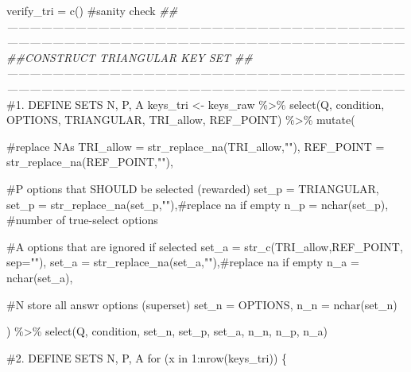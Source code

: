 \documentclass[
  letterpaper,
  DIV=11,
  numbers=noendperiod]{scrreprt}
\newenvironment{Shaded}{\begin{snugshade}}{\end{snugshade}}
\newcommand{\AttributeTok}[1]{\textcolor[rgb]{0.40,0.45,0.13}{#1}}
\newcommand{\CommentTok}[1]{\textcolor[rgb]{0.37,0.37,0.37}{#1}}
\newcommand{\ControlFlowTok}[1]{\textcolor[rgb]{0.00,0.23,0.31}{#1}}
\newcommand{\DecValTok}[1]{\textcolor[rgb]{0.68,0.00,0.00}{#1}}
\newcommand{\DocumentationTok}[1]{\textcolor[rgb]{0.37,0.37,0.37}{\textit{#1}}}
\newcommand{\FunctionTok}[1]{\textcolor[rgb]{0.28,0.35,0.67}{#1}}
\newcommand{\NormalTok}[1]{\textcolor[rgb]{0.00,0.23,0.31}{#1}}
\newcommand{\OtherTok}[1]{\textcolor[rgb]{0.00,0.23,0.31}{#1}}
\newcommand{\SpecialCharTok}[1]{\textcolor[rgb]{0.37,0.37,0.37}{#1}}
\newcommand{\StringTok}[1]{\textcolor[rgb]{0.13,0.47,0.30}{#1}}
\begin{document}
\begin{Shaded}
\begin{Highlighting}[]
\NormalTok{verify\_tri }\OtherTok{=} \FunctionTok{c}\NormalTok{() }\CommentTok{\#sanity check}
\DocumentationTok{\#\#——————————————————————————————————————————————————————————————————————}
\DocumentationTok{\#\#CONSTRUCT TRIANGULAR KEY SET}
\DocumentationTok{\#\#——————————————————————————————————————————————————————————————————————}
\CommentTok{\#1. DEFINE SETS N, P, A}
\NormalTok{keys\_tri }\OtherTok{\textless{}{-}}\NormalTok{ keys\_raw }\SpecialCharTok{\%\textgreater{}\%} 
  \FunctionTok{select}\NormalTok{(Q, condition, OPTIONS, TRIANGULAR, TRI\_allow, REF\_POINT) }\SpecialCharTok{\%\textgreater{}\%} 
  \FunctionTok{mutate}\NormalTok{(}
    
    \CommentTok{\#replace NAs }
    \AttributeTok{TRI\_allow =} \FunctionTok{str\_replace\_na}\NormalTok{(TRI\_allow,}\StringTok{""}\NormalTok{),}
    \AttributeTok{REF\_POINT =} \FunctionTok{str\_replace\_na}\NormalTok{(REF\_POINT,}\StringTok{""}\NormalTok{),}
    
    \CommentTok{\#P options that SHOULD be selected (rewarded)}
    \AttributeTok{set\_p =}\NormalTok{ TRIANGULAR,}
    \AttributeTok{set\_p =} \FunctionTok{str\_replace\_na}\NormalTok{(set\_p,}\StringTok{""}\NormalTok{),}\CommentTok{\#replace na if empty}
    \AttributeTok{n\_p =} \FunctionTok{nchar}\NormalTok{(set\_p), }\CommentTok{\#number of true{-}select options}
    
    \CommentTok{\#A options that are ignored if selected }
    \AttributeTok{set\_a =} \FunctionTok{str\_c}\NormalTok{(TRI\_allow,REF\_POINT, }\AttributeTok{sep=}\StringTok{""}\NormalTok{),}
    \AttributeTok{set\_a =} \FunctionTok{str\_replace\_na}\NormalTok{(set\_a,}\StringTok{""}\NormalTok{),}\CommentTok{\#replace na if empty}
    \AttributeTok{n\_a =} \FunctionTok{nchar}\NormalTok{(set\_a),}
    
    \CommentTok{\#N store all answr options (superset)}
    \AttributeTok{set\_n =}\NormalTok{ OPTIONS,  }
    \AttributeTok{n\_n =} \FunctionTok{nchar}\NormalTok{(set\_n)}
  
\NormalTok{) }\SpecialCharTok{\%\textgreater{}\%} \FunctionTok{select}\NormalTok{(Q, condition, set\_n, set\_p, set\_a, n\_n, n\_p, n\_a)}

\CommentTok{\#2. DEFINE SETS N, P, A}
\ControlFlowTok{for}\NormalTok{ (x }\ControlFlowTok{in} \DecValTok{1}\SpecialCharTok{:}\FunctionTok{nrow}\NormalTok{(keys\_tri)) \{}
  

\end{Highlighting}
\end{Shaded}
\end{document}
